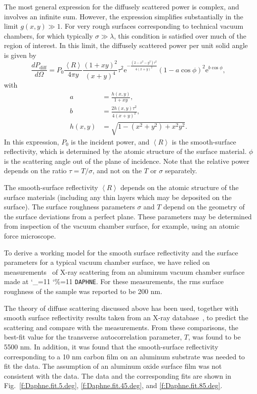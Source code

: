 \documentclass[11pt]{article}
\newcommand\ttcmd{\begingroup\catcode`\_=11 \catcode`\%=11 \dottcmd}
\newcommand\dottcmd[1]{\texttt{#1}\endgroup}
\newcommand{\vn}{\ttcmd}
\begin{document}
The most general expression for the diffusely scattered power is
complex, and involves an infinite sum.  However, the expression
simplifies substantially in the limit $g(x,y)\gg 1.$ For very rough
surfaces corresponding to technical vacuum chambers, for which
typically $\sigma \gg \lambda$, this condition is satisfied over much
of the region of interest. In this limit, the diffusely scattered
power per unit solid angle is given by
  \begin{equation}
  \frac{d P_{\textrm{diff}}}{d \Omega} = P_{0}\frac{\left<R\right>}{4\pi y}
  \frac{(1+xy)^{2}}{(x+y)^{4}}\tau^{2}\textrm{e}^{-\frac{(2-x^{2}-y^{2})
  \tau^{2}}{4(x+y)^{2}}}(1-a\cos\phi)^{2}\textrm{e}^{b\cos\phi},
  \label{Eq.diffuse.power}
  \end{equation}
with
   \begin{align}
   a&=\frac{h(x,y)}{1+xy}, \\
   b&=\frac{2h(x,y)\tau^{2}}{4(x+y)^{2}}, \\
   h(x,y)&=\sqrt{1-(x^{2}+y^{2})+x^{2}y^{2}}.
   \end{align}
In this expression, $P_{0}$ is the incident power, and
$\left<R\right>$ is the smooth-surface reflectivity, which is
determined by the atomic structure of the surface material. $\phi$ is
the scattering angle out of the plane of incidence. Note that the
relative power depends on the ratio $\tau=T/\sigma$, and not on the
$T$ or $\sigma$ separately.

The smooth-surface reflectivity $\left<R\right>$ depends on the atomic
structure of the surface materials (including any thin layers which
may be deposited on the surface). The surface roughness parameters
$\sigma$ and $T$ depend on the geometry of the surface deviations from
a perfect plane. These parameters may be determined from inspection of
the vacuum chamber surface, for example, using an atomic force
microscope.

To derive a working model for the smooth surface reflectivity and the
surface parameters for a typical vacuum chamber surface, we have
relied on measurements~\cite{b:mehne} of X-ray scattering
from an aluminum vacuum chamber surface made at \vn{DAPHNE}. For
these measurements, the rms surface roughness of the sample was
reported to be 200 nm.

The theory of diffuse scattering discussed above has been used,
together with smooth surface reflectivity results taken from an X-ray
database~\cite{b:henke}, to predict the scattering and compare with
the measurements. From these comparisons, the best-fit value for the
transverse autocorrelation parameter, $T$, was found to be 5500 nm. In
addition, it was found that the smooth-surface reflectivity
corresponding to a 10 nm carbon film on an aluminum substrate was
needed to fit the data. The assumption of an aluminum oxide surface
film was not consistent with the data. The data and the corresponding
fits are shown in Fig.~\ref{f:Daphne.fit.5.deg},
\ref{f:Daphne.fit.45.deg}, and \ref{f:Daphne.fit.85.deg}.
\end{document}
